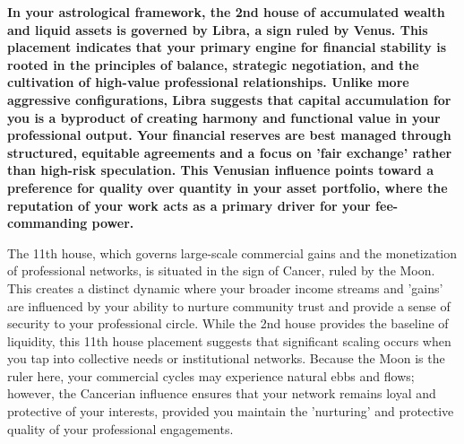 
\label{topic52}

{\fontsize{9.5}{13.8}\selectfont\bfseries\color{DeepSlate} In your astrological framework, the 2nd house of accumulated wealth and liquid assets is governed by Libra, a sign ruled by Venus. This placement indicates that your primary engine for financial stability is rooted in the principles of balance, strategic negotiation, and the cultivation of high-value professional relationships. Unlike more aggressive configurations, Libra suggests that capital accumulation for you is a byproduct of creating harmony and functional value in your professional output. Your financial reserves are best managed through structured, equitable agreements and a focus on 'fair exchange' rather than high-risk speculation. This Venusian influence points toward a preference for quality over quantity in your asset portfolio, where the reputation of your work acts as a primary driver for your fee-commanding power.}\par\vspace{2mm}

{\fontsize{9}{13}\selectfont The 11th house, which governs large-scale commercial gains and the monetization of professional networks, is situated in the sign of Cancer, ruled by the Moon. This creates a distinct dynamic where your broader income streams and 'gains' are influenced by your ability to nurture community trust and provide a sense of security to your professional circle. While the 2nd house provides the baseline of liquidity, this 11th house placement suggests that significant scaling occurs when you tap into collective needs or institutional networks. Because the Moon is the ruler here, your commercial cycles may experience natural ebbs and flows; however, the Cancerian influence ensures that your network remains loyal and protective of your interests, provided you maintain the 'nurturing' and protective quality of your professional engagements.}\par\vspace{1.8mm}

